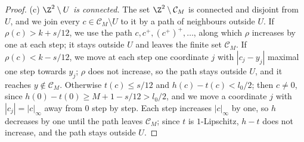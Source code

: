 \begin{proof}
(c) \emph{$\Z^2 \setminus U$ is connected.} The set $\Z^2 \setminus \mathcal C_M$ is connected and disjoint from $U$, and we join every $c \in \mathcal C_M \setminus U$ to it by a path of neighbours outside $U$. If $\rho(c) > k + s/12$, we use the path $c, c^+, (c^+)^+, \dots$, along which $\rho$ increases by one at each step; it stays outside $U$ and leaves the finite set $\mathcal C_M$. If $\rho(c) < k - s/12$, we move at each step one coordinate $j$ with $|c_j - y_j|$ maximal one step towards $y_j$; $\rho$ does not increase, so the path stays outside $U$, and it reaches $y \notin \mathcal C_M$. Otherwise $t(c) \le s/12$ and $h(c) - t(c) < l_0/2$; then $c \neq 0$, since $h(0) - t(0) \ge M + 1 - s/12 > l_0/2$, and we move a coordinate $j$ with $|c_j| = |c|_\infty$ away from $0$ step by step. Each step increases $|c|_\infty$ by one, so $h$ decreases by one until the path leaves $\mathcal C_M$; since $t$ is $1$-Lipschitz, $h - t$ does not increase, and the path stays outside $U$.


\end{proof}
